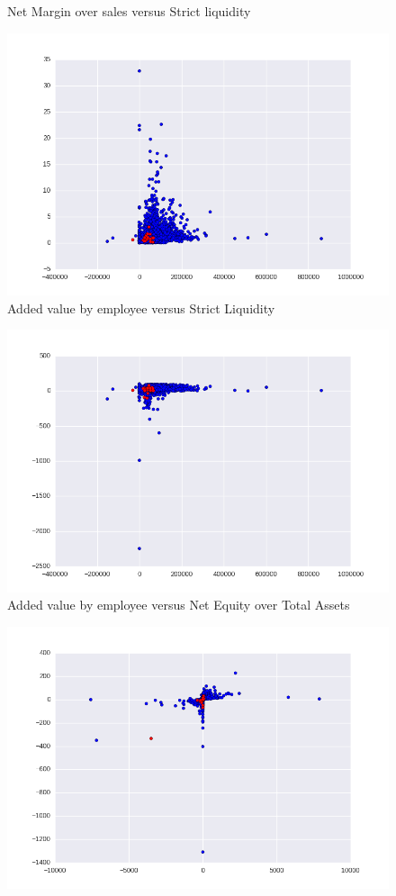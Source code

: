 \documentclass[DIV=calc, paper=a4, fontsize=11pt, twocolumn]{scrartcl}
\begin{document}
\begin{appendices}
\begin{figure}[h]
  \caption{Net Margin over sales versus Strict liquidity}
\end{figure}
\begin{figure}[h]
  \centering
  \includegraphics[width=0.8\linewidth]{cr4xr14.png}
  \caption{Added value by employee versus Strict Liquidity}
\end{figure}
\begin{figure}[h]
  \centering
  \includegraphics[width=0.8\linewidth]{cr4xr19.png}
  \caption{Added value by employee versus Net Equity over Total Assets}
\end{figure}
  \begin{figure}[h]
    \centering
    \includegraphics[width=0.8\linewidth]{cr9xr12.png}

\end{figure}
\end{appendices}
\end{document}
